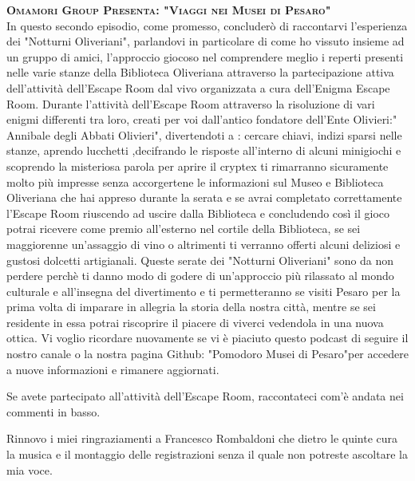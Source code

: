 \documentclass[hidelinks,12pt,a4paper]{article}
\begin{document}
\begin{flushleft}
		      \item{\scshape\bfseries Omamori Group Presenta: "Viaggi nei Musei di Pesaro"\\}
		      In questo secondo episodio, come promesso, concluderò di raccontarvi l'esperienza dei "Notturni Oliveriani", parlandovi in particolare di come ho vissuto insieme ad un gruppo di amici, l'approccio giocoso nel comprendere meglio i reperti presenti nelle varie stanze della Biblioteca Oliveriana attraverso la partecipazione attiva dell'attività dell'Escape Room dal vivo organizzata a cura dell'Enigma Escape Room.
		      Durante l'attività dell'Escape Room attraverso la risoluzione di vari enigmi differenti tra loro, creati per voi dall'antico fondatore dell'Ente Olivieri:" Annibale degli Abbati Olivieri", divertendoti a : cercare chiavi, indizi sparsi nelle stanze, aprendo lucchetti ,decifrando le risposte all'interno di alcuni minigiochi e scoprendo la misteriosa parola per aprire il cryptex ti rimarranno sicuramente molto più impresse senza accorgertene le informazioni sul Museo e Biblioteca Oliveriana che hai appreso durante la serata e se avrai completato correttamente l'Escape Room riuscendo ad uscire dalla Biblioteca e concludendo così il gioco potrai ricevere come premio all'esterno nel cortile della Biblioteca, se sei maggiorenne un'assaggio di vino o altrimenti ti verranno offerti alcuni deliziosi e gustosi dolcetti artigianali.
		      Queste serate dei "Notturni Oliveriani" sono da non perdere perchè ti danno modo di godere di un'approccio più rilassato al mondo culturale e all'insegna del divertimento e ti permetteranno se visiti Pesaro per la prima volta di imparare in allegria la storia della nostra città, mentre se sei residente in essa potrai riscoprire il piacere di viverci vedendola in una nuova ottica.
		      Vi voglio ricordare nuovamente se vi è piaciuto questo podcast di seguire il nostro canale o la nostra pagina Github: "Pomodoro Musei di Pesaro"per accedere a nuove informazioni e rimanere aggiornati.
		      
		      Se avete partecipato all'attività dell'Escape Room, raccontateci com'è andata nei commenti in basso.
		      
		      Rinnovo i miei ringraziamenti a Francesco Rombaldoni che dietro le quinte cura la musica e il montaggio delle registrazioni 
		      senza il quale non potreste ascoltare la mia voce.
		      

\end{flushleft}
\end{document}
